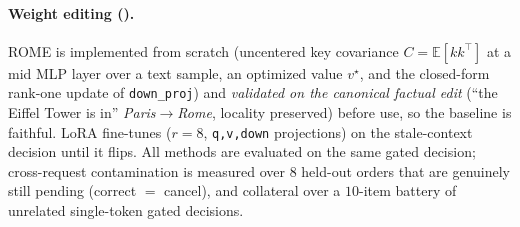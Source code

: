 \paragraph{Weight editing ().} ROME is implemented from scratch (uncentered key covariance
$C{=}\mathbb{E}[kk^\top]$ at a mid MLP layer over a text sample, an optimized value $v^\star$, and the
closed-form rank-one update of \texttt{down\_proj}) and \emph{validated on the canonical factual edit}
(``the Eiffel Tower is in'' \emph{Paris}$\to$\emph{Rome}, locality preserved) before use, so the baseline
is faithful. LoRA fine-tunes ($r{=}8$, \texttt{q,v,down} projections) on the stale-context decision until it
flips. All methods are evaluated on the same gated decision; cross-request contamination is measured over
$8$ held-out orders that are genuinely still pending (correct $=$ cancel), and collateral over a $10$-item
battery of unrelated single-token gated decisions.

